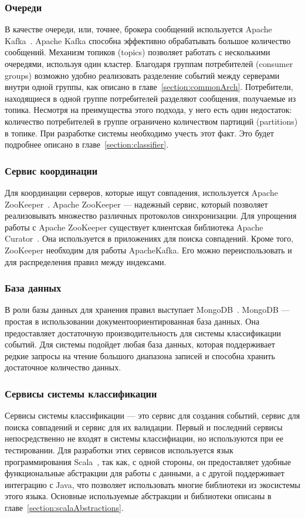 \documentclass[14pt]{article}
\begin{document}
\subsubsection{Очереди}
В качестве очереди, или, точнее, брокера сообщений используется Apache Kafka~\cite{kafka}. Apache Kafka способна эффективно обрабатывать большое количество сообщений. Механизм топиков (topics) позволяет работать с несколькими очередями, используя один кластер. Благодаря группам потребителей (consumer groups) возможно удобно реализовать разделение событий между серверами внутри одной группы, как описано в главе~\ref{section:commonArch}. Потребители, находящиеся в одной группе потребителей разделяют сообщения, получаемые из топика. Несмотря на преимущества этого подхода, у него есть один недостаток: количество потребителей в группе ограничено количеством партиций (partitions) в топике. При разработке системы необходимо учесть этот факт. Это будет подробнее описано в главе~\ref{section:classifier}.

\subsubsection{Сервис координации}
Для координации серверов, которые ищут совпадения, используется Apache ZooKeeper~\cite{zookeeper}. Apache ZooKeeper --- надежный сервис, который позволяет реализовывать множество различных протоколов синхронизации. Для упрощения работы с Apache ZooKeeper существует клиентская библиотека Apache Curator~\cite{curator}. Она используется в приложениях для поиска совпадений. Кроме того, ZooKeeper необходим для работы ApacheKafka. Его можно переиспользовать и для распределения правил между индексами.

\subsubsection{База данных}
В роли базы данных для хранения правил выступает MongoDB~\cite{mongo}. MongoDB --- простая в использовании документоориентированная база данных. Она предоставляет достаточную производительность для системы классификации событий. Для системы подойдет любая база данных, которая поддерживает редкие запросы на чтение большого диапазона записей и способна хранить достаточное количество данных.

\subsubsection{Сервисы системы классификации}
Сервисы системы классификации --- это сервис для создания событий, сервис для поиска совпадений и сервис для их валидации. Первый и последний сервисы непосредственно не входят в системы классифиации, но используются при ее тестировании. Для разработки этих сервисов используется язык программирования Scala~\cite{scala}, так как, с одной стороны, он предоставляет удобные функциональные абстракции для работы с данными, а с другой поддерживает интеграцию с Java, что позволяет использовать многие библиотеки из экосистемы этого языка. Основные используемые абстракции и библиотеки описаны в главе~\ref{section:scalaAbstractions}.
\end{document}
